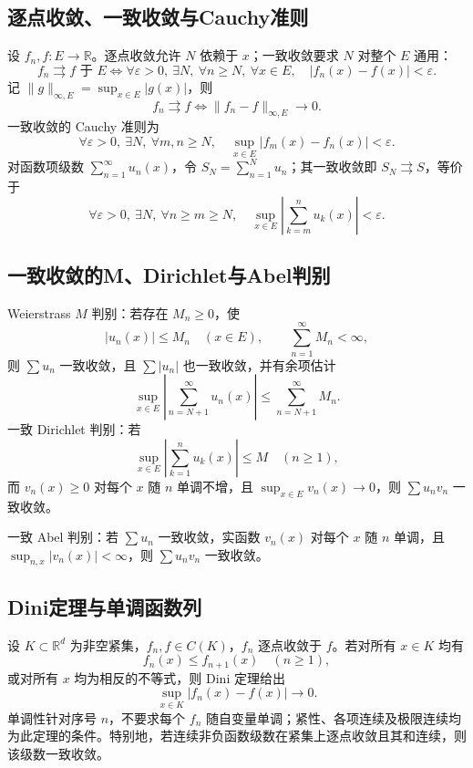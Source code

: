\documentclass[../main.tex]{subfiles}
\begin{document}
\subsection{逐点收敛、一致收敛与Cauchy准则}
设 $f_n,f:E\to\mathbb R$。逐点收敛允许 $N$ 依赖于 $x$；一致收敛要求 $N$ 对整个 $E$ 通用：
\[
f_n\rightrightarrows f\text{ 于 }E
\iff\forall\varepsilon>0,\ \exists N,\ \forall n\ge N,\ \forall x\in E,
\quad|f_n(x)-f(x)|<\varepsilon.
\]
记 $\|g\|_{\infty,E}=\sup_{x\in E}|g(x)|$，则
\[
f_n\rightrightarrows f\iff\|f_n-f\|_{\infty,E}\to0.
\]
一致收敛的 Cauchy 准则为
\[
\forall\varepsilon>0,\ \exists N,\ \forall m,n\ge N,\quad
\sup_{x\in E}|f_m(x)-f_n(x)|<\varepsilon.
\]
对函数项级数 $\sum_{n=1}^\infty u_n(x)$，令 $S_N=\sum_{n=1}^Nu_n$；其一致收敛即 $S_N\rightrightarrows S$，等价于
\[
\forall\varepsilon>0,\ \exists N,\ \forall n\ge m\ge N,\quad
\sup_{x\in E}\left|\sum_{k=m}^nu_k(x)\right|<\varepsilon.
\]
\subsection{一致收敛的M、Dirichlet与Abel判别}
Weierstrass $M$ 判别：若存在 $M_n\ge0$，使
\[
|u_n(x)|\le M_n\quad(x\in E),\qquad
\sum_{n=1}^\infty M_n<\infty,
\]
则 $\sum u_n$ 一致收敛，且 $\sum|u_n|$ 也一致收敛，并有余项估计
\[
\sup_{x\in E}\left|\sum_{n=N+1}^\infty u_n(x)\right|
\le\sum_{n=N+1}^\infty M_n.
\]
一致 Dirichlet 判别：若
\[
\sup_{x\in E}\left|\sum_{k=1}^nu_k(x)\right|\le M\quad(n\ge1),
\]
而 $v_n(x)\ge0$ 对每个 $x$ 随 $n$ 单调不增，且 $\sup_{x\in E}v_n(x)\to0$，则 $\sum u_nv_n$ 一致收敛。
\par\pagebreak[0]\begin{samepage}
一致 Abel 判别：若 $\sum u_n$ 一致收敛，实函数 $v_n(x)$ 对每个 $x$ 随 $n$ 单调，且 $\sup_{n,x}|v_n(x)|<\infty$，则 $\sum u_nv_n$ 一致收敛。
\par\end{samepage}\pagebreak[0]
\subsection{Dini定理与单调函数列}
设 $K\subset\mathbb R^d$ 为非空紧集，$f_n,f\in C(K)$，$f_n$ 逐点收敛于 $f$。若对所有 $x\in K$ 均有
\[
f_n(x)\le f_{n+1}(x)\quad(n\ge1),
\]
或对所有 $x$ 均为相反的不等式，则 Dini 定理给出
\[
\sup_{x\in K}|f_n(x)-f(x)|\longrightarrow0.
\]
单调性针对序号 $n$，不要求每个 $f_n$ 随自变量单调；紧性、各项连续及极限连续均为此定理的条件。特别地，若连续非负函数级数在紧集上逐点收敛且其和连续，则该级数一致收敛。
\end{document}
